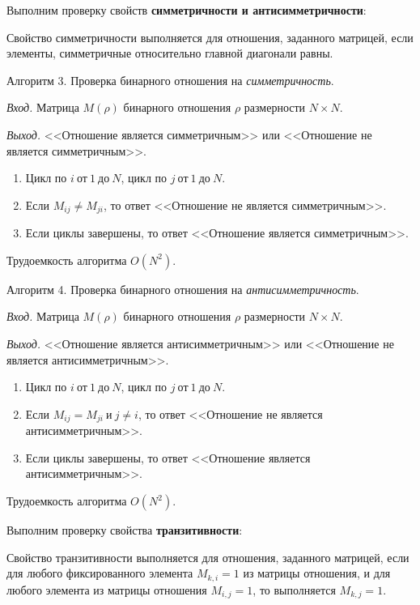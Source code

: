 \documentclass[bachelor, och, labwork]{shiza}
\begin{document}
Выполним проверку свойств \textbf{симметричности и антисимметричности}:

Свойство симметричности выполняется для отношения, заданного матрицей, если
элементы, симметричные относительно главной диагонали равны.

Алгоритм 3. Проверка бинарного отношения на \textit{симметричность}.

\textit{Вход.} Матрица $M(\rho)$ бинарного отношения $\rho$ размерности
$N \times N$.

\textit{Выход.} <<Отношение является симметричным>> или <<Отношение не является
симметричным>>.

\begin{enumerate}
    \item Цикл по $i ~\text{от}~ 1 ~\text{до}~ N$, 
    цикл по $j ~\text{от}~ 1 ~\text{до}~ N$.

    \item Если $M_{ij} \not= M_{ji}$, то ответ <<Отношение не является симметричным>>.
    
    \item Если циклы завершены, то ответ <<Отношение является симметричным>>.

\end{enumerate}
Трудоемкость алгоритма $O(N^2)$.

Алгоритм 4. Проверка бинарного отношения на \textit{антисимметричность}.

\textit{Вход.} Матрица $M(\rho)$ бинарного отношения $\rho$ размерности
$N \times N$.

\textit{Выход.} <<Отношение является антисимметричным>> или <<Отношение не является
антисимметричным>>.

\begin{enumerate}
    \item Цикл по $i ~\text{от}~ 1 ~\text{до}~ N$, 
    цикл по $j ~\text{от}~ 1 ~\text{до}~ N$.

    \item Если $M_{ij} = M_{ji} ~\text{и}~ j \ne i$, то ответ <<Отношение не является антисимметричным>>.
    
    \item Если циклы завершены, то ответ <<Отношение является антисимметричным>>.

\end{enumerate}
Трудоемкость алгоритма $O(N^2)$.

Выполним проверку свойства \textbf{транзитивности}:

Свойство транзитивности выполняется для отношения, заданного матрицей, если для 
любого фиксированного элемента $M_{k,i}=1$ из матрицы отношения, и для любого
элемента из матрицы отношения $M_{i,j}=1$, то выполняется $M_{k,j}=1$.
\end{document}
